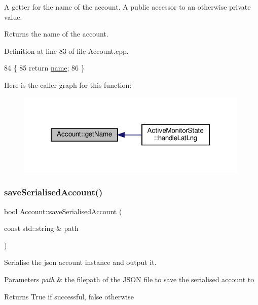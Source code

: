 A getter for the name of the account. A public accessor to an otherwise private value.

\begin{DoxyReturn}{Returns}
the name of the account. 
\end{DoxyReturn}


Definition at line 83 of file Account.\+cpp.


\begin{DoxyCode}
84 \{
85     \textcolor{keywordflow}{return} \hyperlink{class_account_a586e2c3461c5231eacf7c96851024a75}{name};
86 \}
\end{DoxyCode}
Here is the caller graph for this function\+:\nopagebreak
\begin{figure}[H]
\begin{center}
\leavevmode
\includegraphics[width=314pt]{db/d22/class_account_a1ef22885e8c6f145475c3306a4e6d74a_icgraph}
\end{center}
\end{figure}
\mbox{\label{class_account_a9ff3a257536bc933e0a39207bb89243d}} 
\subsubsection{\texorpdfstring{save\+Serialised\+Account()}{saveSerialisedAccount()}}
{\footnotesize\ttfamily bool Account\+::save\+Serialised\+Account (\begin{DoxyParamCaption}\item[{const std\+::string \&}]{path }\end{DoxyParamCaption})}

Serialise the json account instance and output it.


\begin{DoxyParams}{Parameters}
{\em path} & the filepath of the J\+S\+ON file to save the serialised account to \\
\hline
\end{DoxyParams}
\begin{DoxyReturn}{Returns}
True if successful, false otherwise 
\end{DoxyReturn}


